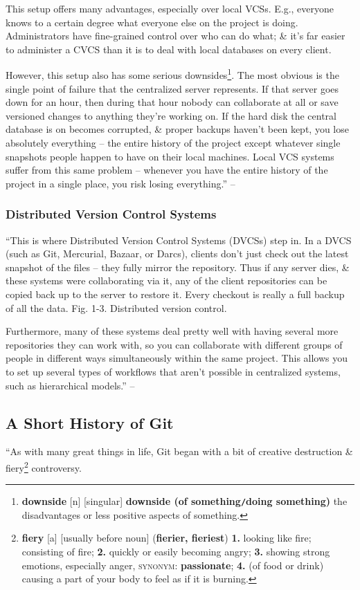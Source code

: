 \documentclass[oneside]{book}
\numberwithin{equation}{section}
\begin{document}
This setup offers many advantages, especially over local VCSs. E.g., everyone knows to a certain degree what everyone else on the project is doing. Administrators have fine-grained control over who can do what; \& it's far easier to administer a CVCS than it is to deal with local databases on every client.

However, this setup also has some serious downsides\footnote{\textbf{downside} [n] [singular] \textbf{downside (of something\texttt{/}doing something)} the disadvantages or less positive aspects of something.}. The most obvious is the single point of failure that the centralized server represents. If that server goes down for an hour, then during that hour nobody can collaborate at all or save versioned changes to anything they're working on. If the hard disk the central database is on becomes corrupted, \& proper backups haven't been kept, you lose absolutely everything -- the entire history of the project except whatever single snapshots people happen to have on their local machines. Local VCS systems suffer from this same problem -- whenever you have the entire history of the project in a single place, you risk losing everything.'' -- \cite[p. 3]{Chacon_Straub2014}

\subsubsection{Distributed Version Control Systems}
``This is where Distributed Version Control Systems (DVCSs) step in. In a DVCS (such as Git, Mercurial, Bazaar, or Darcs), clients don't just check out the latest snapshot of the files -- they fully mirror the repository. Thus if any server dies, \& these systems were collaborating via it, any of the client repositories can be copied back up to the server to restore it. Every checkout is really a full backup of all the data. \textsf{Fig. 1-3. Distributed version control.}

Furthermore, many of these systems deal pretty well with having several more repositories they can work with, so you can collaborate with different groups of people in different ways simultaneously within the same project. This allows you to set up several types of workflows that aren't possible in centralized systems, such as hierarchical models.'' -- \cite[p. 4]{Chacon_Straub2014}

\subsection{A Short History of Git}
``As with many great things in life, Git began with a bit of creative destruction \& fiery\footnote{\textbf{fiery} [a] [usually before noun] (\textbf{fierier, fieriest}) \textbf{1.} looking like fire; consisting of fire; \textbf{2.} quickly or easily becoming angry; \textbf{3.} showing strong emotions, especially anger, \textsc{synonym}: \textbf{passionate}; \textbf{4.} (of food or drink) causing a part of your body to feel as if it is burning.} controversy.
\end{document}
